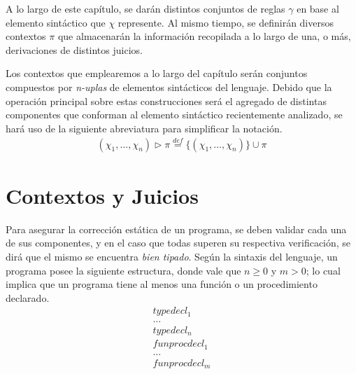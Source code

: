 A lo largo de este capítulo, se darán distintos conjuntos de reglas $\gamma$ en base al elemento sintáctico que $\chi$ represente.
Al mismo tiempo, se definirán diversos contextos $\pi$ que almacenarán la información recopilada a lo largo de una, o más, derivaciones de distintos juicios.

Los contextos que emplearemos a lo largo del capítulo serán conjuntos compuestos por \textit{n-uplas} de elementos sintácticos del lenguaje.
Debido que la operación principal sobre estas construcciones será el agregado de distintas componentes que conforman al elemento sintáctico recientemente analizado, se hará uso de la siguiente abreviatura para simplificar la notación.
\begin{gather*}
(\chi_1, \ldots, \chi_n) \triangleright \pi \overset{def}{=} \{ (\chi_1, \ldots, \chi_n) \} \cup \pi
\end{gather*}

\section{Contextos y Juicios}

Para asegurar la corrección estática de un programa, se deben validar cada una de sus componentes, y en el caso que todas superen su respectiva verificación, se dirá que el mismo se encuentra \textit{bien tipado}.
Según la sintaxis del lenguaje, un programa posee la siguiente estructura, donde vale que $n \geq 0$ y $m > 0$; lo cual implica que un programa tiene al menos una función o un procedimiento declarado.
\begin{gather*}
typedecl_1
\\
\ldots
\\
typedecl_n
\\
funprocdecl_1
\\
\ldots
\\
funprocdecl_m
\end{gather*}